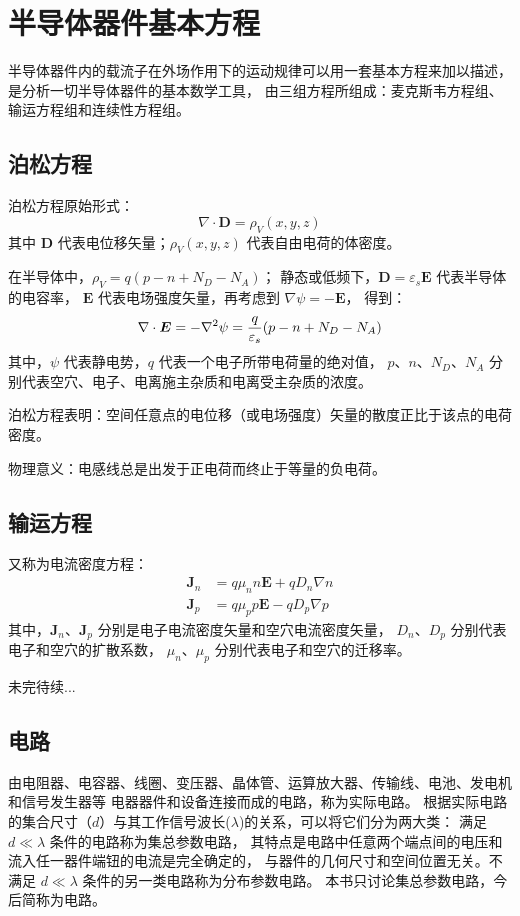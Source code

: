 \section{半导体器件基本方程}

半导体器件内的载流子在外场作用下的运动规律可以用一套基本方程来加以描述，
是分析一切半导体器件的基本数学工具，
由三组方程所组成：麦克斯韦方程组、输运方程组和连续性方程组。

\subsection{泊松方程}
泊松方程原始形式：
\begin{equation}
    \nabla \cdot \boldsymbol{D} = \rho_V(x,y,z)
\end{equation}
其中 $\boldsymbol{D}$ 代表电位移矢量；$\rho_V(x,y,z)$ 代表自由电荷的体密度。

在半导体中，$\rho_V=q(p-n+N_D-N_A)$；
静态或低频下，$\boldsymbol{D}=\varepsilon_s\boldsymbol{E}$ 代表半导体的电容率，
$\boldsymbol{E}$ 代表电场强度矢量，再考虑到 $\nabla \psi = -\boldsymbol{E}$，
得到：
\begin{equation}
    \nabla \cdot \boldsymbol{E} = -\nabla^2\psi
    = {q \over \varepsilon_s}(p-n+N_D-N_A)
\end{equation}
其中，$\psi$ 代表静电势，$q$ 代表一个电子所带电荷量的绝对值，
$p$、$n$、$N_D$、$N_A$ 分别代表空穴、电子、电离施主杂质和电离受主杂质的浓度。

泊松方程表明：空间任意点的电位移（或电场强度）矢量的散度正比于该点的电荷密度。

物理意义：电感线总是出发于正电荷而终止于等量的负电荷。

\subsection{输运方程}

又称为电流密度方程：
\begin{align}
\boldsymbol{J}_n &= q\mu_nn\boldsymbol{E} + qD_n\nabla{}n \\
\boldsymbol{J}_p &= q\mu_pp\boldsymbol{E} - qD_p\nabla{}p
\end{align}
其中，$\boldsymbol{J}_n$、$\boldsymbol{J}_p$
分别是电子电流密度矢量和空穴电流密度矢量，
$D_n$、$D_p$ 分别代表电子和空穴的扩散系数，
$\mu_n$、$\mu_p$ 分别代表电子和空穴的迁移率。

未完待续...

\subsection{电路}
由电阻器、电容器、线圈、变压器、晶体管、运算放大器、传输线、电池、发电机和信号发生器等
电器器件和设备连接而成的电路，称为实际电路。
根据实际电路的集合尺寸（$d$）与其工作信号波长($\lambda$)的关系，可以将它们分为两大类：
满足 $d\ll\lambda$ 条件的电路称为集总参数电路，
其特点是电路中任意两个端点间的电压和流入任一器件端钮的电流是完全确定的，
与器件的几何尺寸和空间位置无关。不满足 $d\ll\lambda$ 条件的另一类电路称为分布参数电路。
本书只讨论集总参数电路，今后简称为电路。

